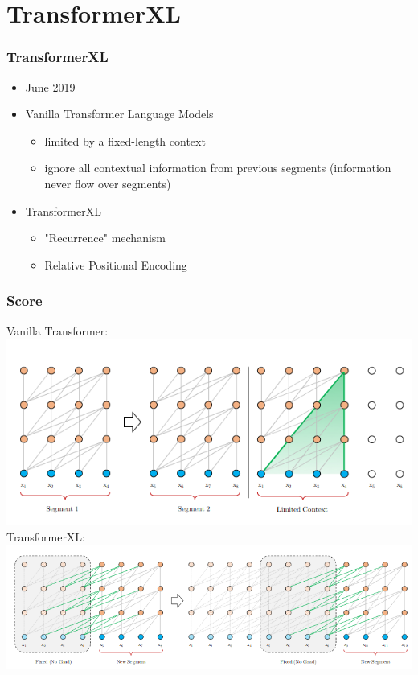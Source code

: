 \documentclass{beamer}
\begin{document}
\section{TransformerXL}
\begin{frame}
    \frametitle{TransformerXL \cite{transformerxl}}
    \begin{itemize}
        \item June 2019
        \item Vanilla Transformer Language Models
        \begin{itemize}
            \item limited by a fixed-length context
            \item ignore all contextual information from previous segments (information never flow over segments)
        \end{itemize}
        \item TransformerXL
        \begin{itemize}
            \item "Recurrence" mechanism
            \item Relative Positional Encoding
        \end{itemize}
    \end{itemize}
\end{frame}

\begin{frame}
    \frametitle{Score}
    \begin{center}
        Vanilla Transformer: \\
        \includegraphics[scale=1.2]{img/transformerxl-train1.png} \\
        TransformerXL: \\
        \includegraphics[scale=1.4]{img/transformerxl-train2.png}
    \end{center}
\end{frame}
\end{document}
